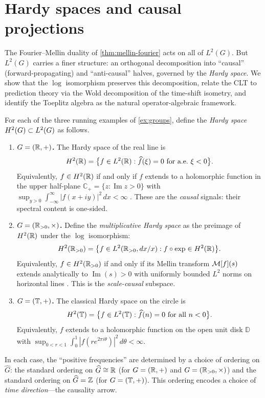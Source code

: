 \section{Hardy spaces and causal projections}\label{sec:hardy}

The Fourier--Mellin duality of \cref{thm:mellin-fourier} acts on all of $L^2(G)$. But $L^2(G)$ carries a finer structure: an orthogonal decomposition into ``causal'' (forward-propagating) and ``anti-causal'' halves, governed by the \emph{Hardy space}. We show that the $\log$ isomorphism preserves this decomposition, relate the CLT to prediction theory via the Wold decomposition of the time-shift isometry, and identify the Toeplitz algebra as the natural operator-algebraic framework.

\begin{definition}\label{def:hardy-space}
For each of the three running examples of \cref{ex:groups}, define the \emph{Hardy space} $H^2(G) \subset L^2(G)$ as follows.
\begin{enumerate}[label=(\alph*)]
\item \textbf{$G = (\mathbb{R}, +)$.} The Hardy space of the real line is
\[
H^2(\mathbb{R}) = \bigl\{f \in L^2(\mathbb{R}) : \widehat{f}(\xi) = 0 \text{ for a.e.\ } \xi < 0\bigr\}.
\]
Equivalently, $f \in H^2(\mathbb{R})$ if and only if $f$ extends to a holomorphic function in the upper half-plane $\mathbb{C}_+ = \{z : \operatorname{Im} z > 0\}$ with
$\sup_{y > 0} \int_{-\infty}^{\infty} |f(x + iy)|^2\, dx < \infty$
\cite[Chapter~II]{Garnett}. These are the \emph{causal} signals: their spectral content is one-sided.

\item \textbf{$G = (\mathbb{R}_{>0}, \times)$.} Define the \emph{multiplicative Hardy space} as the preimage of $H^2(\mathbb{R})$ under the $\log$ isomorphism:
\[
H^2(\mathbb{R}_{>0}) = \bigl\{f \in L^2(\mathbb{R}_{>0}, dx/x) : f \circ \exp \in H^2(\mathbb{R})\bigr\}.
\]
Equivalently, $f \in H^2(\mathbb{R}_{>0})$ if and only if its Mellin transform $\mathcal{M}[f](s)$ extends analytically to $\operatorname{Im}(s) > 0$ with uniformly bounded $L^2$ norms on horizontal lines \cite[Chapter~4]{Hoffman}. This is the \emph{scale-causal} subspace.

\item \textbf{$G = (\mathbb{T}, +)$.} The classical Hardy space on the circle is
\[
H^2(\mathbb{T}) = \bigl\{f \in L^2(\mathbb{T}) : \widehat{f}(n) = 0 \text{ for all } n < 0\bigr\}.
\]
Equivalently, $f$ extends to a holomorphic function on the open unit disk $\mathbb{D}$ with $\sup_{0 < r < 1} \int_0^1 |f(re^{2\pi i\theta})|^2\, d\theta < \infty$.
\end{enumerate}

In each case, the ``positive frequencies'' are determined by a choice of ordering on $\widehat{G}$: the standard ordering on $\widehat{G} \cong \mathbb{R}$ (for $G = (\mathbb{R},+)$ and $G = (\mathbb{R}_{>0},\times)$) and the standard ordering on $\widehat{G} = \mathbb{Z}$ (for $G = (\mathbb{T},+)$). This ordering encodes a choice of \emph{time direction}---the causality arrow.
\end{definition}

